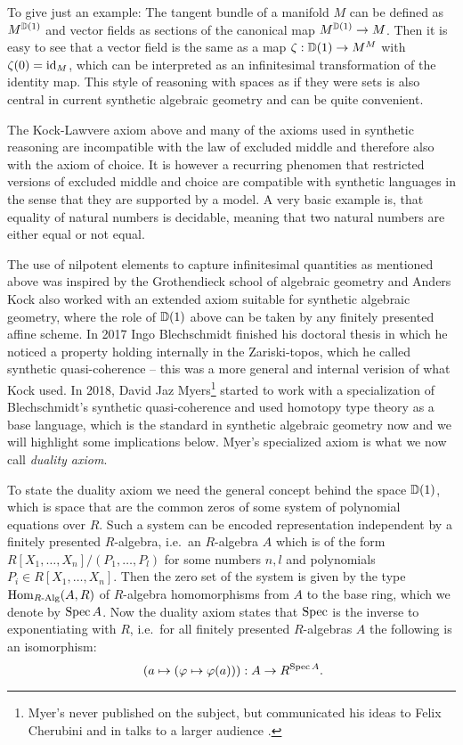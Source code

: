 To give just an example: The tangent bundle of a manifold $M$ can be defined as $M^{\mathbb{D}(1)}$ and vector fields as sections of the canonical map $M^{\mathbb{D}(1)}\to M$. Then it is easy to see that a vector field is the same as a map $\zeta:\mathbb{D}(1)\to M^M$ with $\zeta(0)=\mathrm{id}_M$, which can be interpreted as an infinitesimal transformation of the identity map. This style of reasoning with spaces as if they were sets is also central in current synthetic algebraic geometry and can be quite convenient. 

The Kock-Lawvere axiom above and many of the axioms used in synthetic reasoning are incompatible with the law of excluded middle and therefore also with the axiom of choice. It is however a recurring phenomen that restricted versions of excluded middle and choice are compatible with synthetic languages in the sense that they are supported by a model. A very basic example is, that equality of natural numbers is decidable, meaning that two natural numbers are either equal or not equal. 

The use of nilpotent elements to capture infinitesimal quantities as mentioned above was inspired by the Grothendieck school of algebraic geometry and Anders Kock also worked with an extended axiom \cite{Kock74} suitable for synthetic algebraic geometry, where the role of $\mathbb{D}(1)$ above can be taken by any finitely presented affine scheme. In 2017 Ingo Blechschmidt finished his doctoral thesis in which he noticed a property holding internally in the Zariski-topos, which he called synthetic quasi-coherence -- this was a more general and internal verision of what Kock used. In 2018, David Jaz Myers\footnote{Myer's never published on the subject, but communicated his ideas to Felix Cherubini and in talks to a larger audience \cite{myers-talk1,myers-talk2}.} started to work with a specialization of Blechschmidt's synthetic quasi-coherence and used homotopy type theory as a base language, which is the standard in synthetic algebraic geometry now and we will highlight some implications below. Myer's specialized axiom is what we now call \emph{duality axiom}.

To state the duality axiom we need the general concept behind the space $\mathbb{D}(1)$, which is space that are the common zeros of some system of polynomial equations over $R$. Such a system can be encoded representation independent by a finitely presented $R$-algebra, i.e.\ an $R$-algebra $A$ which is of the form $R[X_1,\dots,X_n]/(P_1,\dots,P_l)$ for some numbers $n,l$ and polynomials $P_i\in R[X_1,\dots,X_n]$.
Then the zero set of the system is given by the type $\mathrm{Hom}_{R\text{-}\mathrm{Alg}}(A,R)$ of $R$-algebra homomorphisms from $A$ to the base ring, which we denote by $\operatorname{Spec} A$.
Now the duality axiom states that $\operatorname{Spec}$ is the inverse to exponentiating with $R$, i.e.\ for all 
finitely presented $R$-algebras $A$ the following is an isomorphism:
\[ (a\mapsto (\varphi\mapsto \varphi(a))) : A\to R^{\Spec A}\rlap{.}\]


